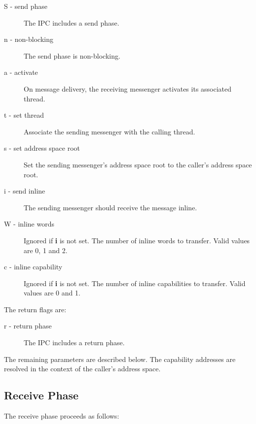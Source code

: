 \begin{description}
\item[S - send phase] The IPC includes a send phase.
\item[n - non-blocking] The send phase is non-blocking.
\item[a - activate] On message delivery, the receiving messenger
  activates its associated thread.
\item[t - set thread] Associate the sending messenger with the calling
  thread.
\item[s - set address space root] Set the sending messenger's address
  space root to the caller's address space root.
\item[i - send inline] The sending messenger should receive the message inline.
\item[W - inline words] Ignored if \textbf{i} is not set.  The number
  of inline words to transfer.  Valid values are 0, 1 and 2.
\item[c - inline capability] Ignored if \textbf{i} is not set.  The
  number of inline capabilities to transfer.  Valid values are 0 and
  1.
\end{description}

The return flags are:

\begin{description}
\item[r - return phase] The IPC includes a return phase.
\end{description}

The remaining parameters are described below.  The capability
addresses are resolved in the context of the caller's address space.

\subsection{Receive Phase}

The receive phase proceeds as follows:


